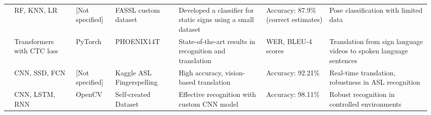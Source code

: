 \begin{footnotesize}
\begin{longtable}{LLLLLLL}
        \cite{weerasooriyaSinhalaFingerspellingSign2022}   & RF, KNN, LR                                                                                                           & [Not specified]          & FASSL custom dataset           & Developed a classifier for static signs using a small dataset                                                                                             & Accuracy: 87.9\% (correct estimates)                   & Pose classification with limited data                                                                                                                                   \\

        \cite{cihancamgozSignLanguageTransformers2020}     & Transformers with CTC loss                                                                                            & PyTorch                  & PHOENIX14T                     & State-of-the-art results in recognition and translation                                                                                                   & WER, BLEU-4 scores                                     & Translation from sign language videos to spoken language sentences                                                                                                      \\

        \cite{abiyevReconstructionConvolutionalNeural2020} & CNN, SSD, FCN                                                                                                         & [Not specified]          & Kaggle ASL Fingerspelling      & High accuracy, vision-based translation                                                                                                                   & Accuracy: 92.21\%                                      & Real-time translation, robustness in ASL recognition                                                                                                                    \\

        \cite{bantupalliAmericanSignLanguage2018}          & CNN, LSTM, RNN                                                                                                        & OpenCV                   & Self-created Dataset           & Effective recognition with custom CNN model                                                                                                               & Accuracy: 98.11\%                                      & Robust recognition in controlled environments                                                                                                                           \\


\end{longtable}
\end{footnotesize}
